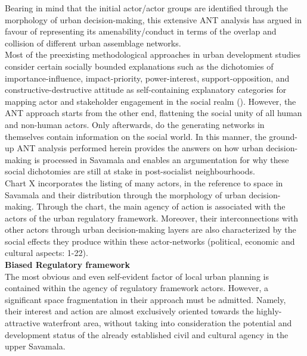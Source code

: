 \documentclass[11pt]{report}
\begin{document}
{{{{Bearing in mind that the initial actor/actor groups are identified through the morphology of urban decision-making, this extensive ANT analysis has argued in favour of representing its amenability/conduct in terms of the overlap and collision of different urban assemblage networks.
\\

Most of the preexisting methodological approaches in urban development studies consider certain socially bounded explanations such as the dichotomies of importance-influence, impact-priority, power-interest, support-opposition, and constructive-destructive attitude as self-containing explanatory categories for mapping actor and stakeholder engagement in the social realm (\href{Mathur}{\citealt{mathur_defining_2007}}).
However, the ANT approach starts from the other end, flattening the social unity of all human and non-human actors. Only afterwards, do the generating networks in themselves contain information on the social world. In this manner, the ground-up ANT analysis performed herein provides the answers on how urban decision-making is processed in Savamala and enables an argumentation for why these social dichotomies are still at stake in post-socialist neighbourhoods.
\\

Chart X %
incorporates the listing of many actors, in the reference to space in Savamala and their distribution through the morphology of urban decision-making.
Through the chart, the main agency of action is associated with the actors of the urban regulatory framework.
Moreover, their interconnections  with other actors through urban decision-making layers are also characterized by the social effects they produce within these actor-networks (political, economic and cultural aspects: 1-22).
\\

\textbf{Biased Regulatory framework}
\\
The most obvious and even self-evident factor of local urban planning is contained within the agency of regulatory framework actors.
However, a significant space fragmentation in their approach must be admitted. Namely, their interest and action are almost exclusively oriented towards the highly-attractive waterfront area, without taking into consideration the potential and development status of the already established civil and cultural agency in the upper Savamala.
\\

}}}}
\end{document}
